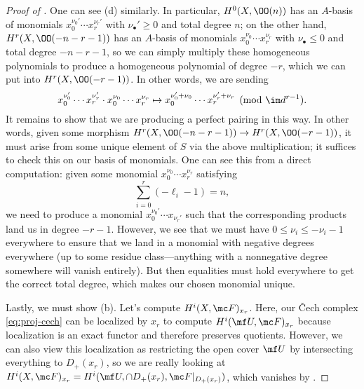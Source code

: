 \documentclass[../notes.tex]{subfiles}
\begin{document}
\begin{proof}[Proof of ]
	One can see (d) similarly. In particular, $H^0(X,\OO(n))$ has an $A$-basis of monomials $x_0^{\nu_0'}\cdots x_r^{\nu_r'}$ with $\nu_\bullet'\ge0$ and total degree $n$; on the other hand, $H^r(X,\OO(-n-r-1))$ has an $A$-basis of monomials $x_0^{\nu_0}\cdots x_r^{\nu_r}$ with $\nu_\bullet\le0$ and total degree $-n-r-1$, so we can simply multiply these homogeneous polynomials to produce a homogeneous polynomial of degree $-r$, which we can put into $H^r(X,\OO(-r-1))$. In other words, we are sending
	\[x_0^{\nu_0'}\cdots x_r^{\nu_r'}\cdot x_0^{\nu_0}\cdots x_r^{\nu_r}\mapsto x_0^{\nu_0'+\nu_0}\cdots x_r^{\nu_r'+\nu_r}\pmod{\im d^{r-1}}.\]
	It remains to show that we are producing a perfect pairing in this way. In other words, given some morphism $H^r(X,\OO(-n-r-1))\to H^r(X,\OO(-r-1))$, it must arise from some unique element of $S$ via the above multiplication; it suffices to check this on our basis of monomials. One can see this from a direct computation: given some monomial $x_0^{\nu_0}\cdots x_r^{\nu_r}$ satisfying
	\[\sum_{i=0}^r(-\ell_i-1)=n,\]
	we need to produce a monomial $x_0^{\nu_0'}\cdots x_{\nu_r'}$ such that the corresponding products land us in degree $-r-1$. However, we see that we must have $0\le\nu_i\le-\nu_i-1$ everywhere to ensure that we land in a monomial with negative degrees everywhere (up to some residue class---anything with a nonnegative degree somewhere will vanish entirely). But then equalities must hold everywhere to get the correct total degree, which makes our chosen monomial unique.

	Lastly, we must show (b). Let's compute $H^i(X,\mc F)_{x_r}$. Here, our \v Cech complex \eqref{eq:proj-cech} can be localized by $x_r$ to compute $H^i(\mf U,\mc F)_{x_r}$ because localization is an exact functor and therefore preserves quotients. However, we can also view this localization as restricting the open cover $\mf U$ by intersecting everything to $D_+(x_r)$, so we are really looking at $H^i(X,\mc F)_{x_r}=H^i(\mf U,\cap D_+(x_r),\mc F|_{D_+(x_r)})$, which vanishes by .


\end{proof}
\end{document}
